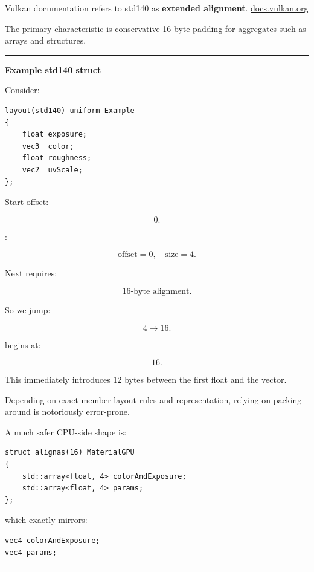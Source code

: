 Vulkan documentation refers to std140 as \textbf{extended alignment}. \href{https://docs.vulkan.org/guide/latest/shader_memory_layout.html?utm_source=chatgpt.com}{docs.vulkan.org}

The primary characteristic is conservative 16-byte padding for aggregates such as arrays and structures.

\begin{center}\rule{0.5\linewidth}{0.5pt}\end{center}

\textbf{Example std140 struct}

Consider:

\begin{verbatim}
layout(std140) uniform Example
{
    float exposure;
    vec3  color;
    float roughness;
    vec2  uvScale;
};
\end{verbatim}

Start offset:

\[
0.
\]

:

\[
\text{offset}=0,\quad\text{size}=4.
\]

Next  requires:

\[
16\text{-byte alignment}.
\]

So we jump:

\[
4\rightarrow16.
\]

 begins at:

\[
16.
\]

This immediately introduces 12 bytes between the first float and the vector.

Depending on exact member-layout rules and representation, relying on packing around  is notoriously error-prone.

A much safer CPU-side shape is:

\begin{verbatim}
struct alignas(16) MaterialGPU
{
    std::array<float, 4> colorAndExposure;
    std::array<float, 4> params;
};
\end{verbatim}

which exactly mirrors:

\begin{verbatim}
vec4 colorAndExposure;
vec4 params;
\end{verbatim}

\begin{center}\rule{0.5\linewidth}{0.5pt}\end{center}

